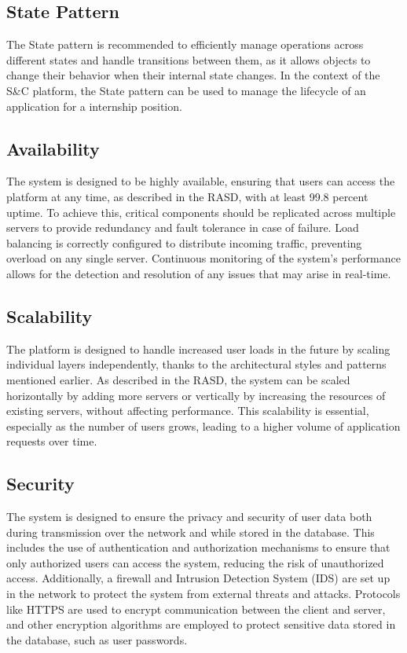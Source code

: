 \subsection{State Pattern}\label{subsec:state pattern}
The State pattern is recommended to efficiently manage operations across different states and handle transitions between them, as it allows objects to change 
their behavior when their internal state changes. In the context of the S\&C platform, the State pattern can be used to manage the lifecycle of an application 
for a internship position.

\subsection{Availability}\label{subsec:availability}
The system is designed to be highly available, ensuring that users can access the platform at any time, as described in the RASD, with at least 99.8 percent 
uptime. To achieve this, critical components should be replicated across multiple servers to provide redundancy and fault tolerance in case of failure. Load 
balancing is correctly configured to distribute incoming traffic, preventing overload on any single server. Continuous monitoring of the system's performance 
allows for the detection and resolution of any issues that may arise in real-time.
\subsection{Scalability}\label{subsec:scalability}
The platform is designed to handle increased user loads in the future by scaling individual layers independently, thanks to the architectural styles and patterns 
mentioned earlier. As described in the RASD, the system can be scaled horizontally by adding more servers or vertically by increasing the resources of existing 
servers, without affecting performance. This scalability is essential, especially as the number of users grows, leading to a higher volume of application 
requests over time.
\subsection{Security}\label{subsec:security}
The system is designed to ensure the privacy and security of user data both during transmission over the network and while stored in the database. This includes 
the use of authentication and authorization mechanisms to ensure that only authorized users can access the system, reducing the risk of unauthorized access. 
Additionally, a firewall and Intrusion Detection System (IDS) are set up in the network to protect the system from external threats and attacks. Protocols like 
HTTPS are used to encrypt communication between the client and server, and other encryption algorithms are employed to protect sensitive data stored in the 
database, such as user passwords.
